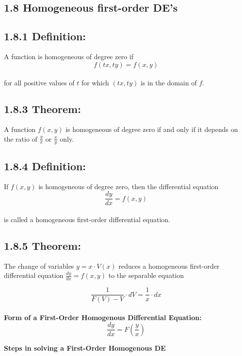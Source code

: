\documentclass{article}
\begin{document}
\begin{flushleft}
{}
\section*{1.8 Homogeneous first-order DE’s}{

\subsection*{\textbf{1.8.1 Definition:}}
A function is homogeneous of degree zero if\\

\[f(tx,ty) = f(x,y)\] \\

for all positive values of $t$ for which $(tx , ty)$ is in the domain of $f$.\\


\subsection*{\textbf{1.8.3 Theorem:}}
 A function $f(x,y)$ is homogeneous of degree zero if and only if it depends on the ratio of $\frac{y}{x}$ or $\frac{x}{y}$ only. \\

\subsection*{\textbf{1.8.4 Definition:}}
If $f(x,y)$ is homogeneous of degree zero, then the differential equation 
\[ \frac{dy}{dx} = f(x,y) \]\\
is called a homogeneous first-order differential equation. 

\subsection*{\textbf{1.8.5 Theorem:}}
The change of variables $ y = x \cdot V(x) $ reduces a homogeneous first-order differential equation 
$ \frac{dy}{dx} = f(x,y) $ to the separable equation 

\[\frac{1}{F(V) - V} \cdot dV = \frac{1}{x} \cdot dx \]\\

\textbf{Form of a First-Order Homogenous Differential Equation:}\\

\[ \frac{dy}{dx} = F (\frac{y}{x}) \]

\textbf{Steps in solving a First-Order Homogenous DE}\\

}
\end{flushleft}
\end{document}
